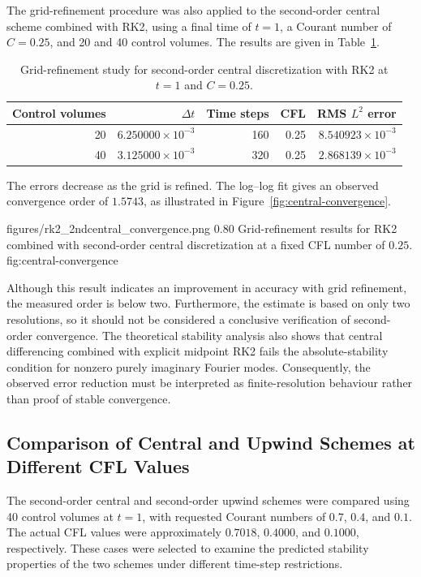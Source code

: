 The grid-refinement procedure was also applied to the second-order central scheme combined with RK2, using a final time of $t=1$, a Courant number of $C=0.25$, and 20 and 40 control volumes. The results are given in Table~\ref{tab:central-grid-convergence}.

\begin{table}[!htbp]
    \centering
    \caption{Grid-refinement study for second-order central discretization with RK2 at $t=1$ and $C=0.25$.}
    \label{tab:central-grid-convergence}
    \small
    \begin{tabular}{r r r r r}
        \toprule
        Control volumes & $\Delta t$ & Time steps & CFL & RMS $L^2$ error \\
        \midrule
        20 & $6.250000\times10^{-3}$ & 160 & 0.25 & $8.540923\times10^{-3}$ \\
        40 & $3.125000\times10^{-3}$ & 320 & 0.25 & $2.868139\times10^{-3}$ \\
        \bottomrule
    \end{tabular}
\end{table}

The errors decrease as the grid is refined. The log--log fit gives an observed convergence order of $1.5743$, as illustrated in Figure~\ref{fig:central-convergence}.

\resultfigure
    {figures/rk2_2ndcentral_convergence.png}
    {0.80}
    {Grid-refinement results for RK2 combined with second-order central discretization at a fixed CFL number of $0.25$.}
    {fig:central-convergence}

Although this result indicates an improvement in accuracy with grid refinement, the measured order is below two. Furthermore, the estimate is based on only two resolutions, so it should not be considered a conclusive verification of second-order convergence. The theoretical stability analysis also shows that central differencing combined with explicit midpoint RK2 fails the absolute-stability condition for nonzero purely imaginary Fourier modes. Consequently, the observed error reduction must be interpreted as finite-resolution behaviour rather than proof of stable convergence.

\subsection{Comparison of Central and Upwind Schemes at Different CFL Values}
\label{subsec:central-upwind-comparison}

The second-order central and second-order upwind schemes were compared using 40 control volumes at $t=1$, with requested Courant numbers of $0.7$, $0.4$, and $0.1$. The actual CFL values were approximately $0.7018$, $0.4000$, and $0.1000$, respectively. These cases were selected to examine the predicted stability properties of the two schemes under different time-step restrictions.

